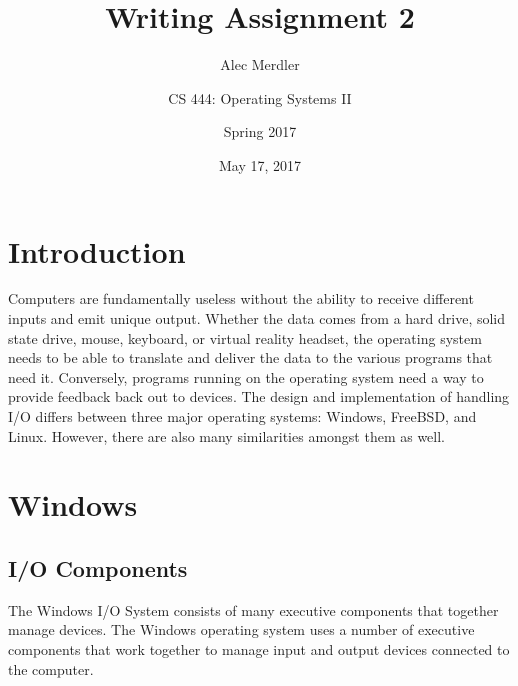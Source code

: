 \documentclass[letterpaper,draftclsnofoot,10pt,onecolumn,titlepage]{IEEEtran}\usepackage[margin=0.75in]{geometry}
\title{Writing Assignment 2}
\author{
	Alec Merdler\\
	\and
	CS 444: Operating Systems II\\
	\and
	Spring 2017\\
}
\date{May 17, 2017}
\begin{document}
\begin{titlepage}
\clearpage\maketitle
\thispagestyle{empty}

\maketitle
\end{titlepage}

\section{Introduction}
Computers are fundamentally useless without the ability to receive different inputs and emit unique output.
Whether the data comes from a hard drive, solid state drive, mouse, keyboard, or virtual reality headset,
the operating system needs to be able to translate and deliver the data to the various programs that need
it. Conversely, programs running on the operating system need a way to provide feedback back out to 
devices. The design and implementation of handling I/O differs between three major operating systems: Windows,
FreeBSD, and Linux. However, there are also many similarities amongst them as well.

\section{Windows}
 
\subsection{I/O Components}
The Windows I/O System consists of many executive components that together manage devices.
The Windows operating system uses a number of executive components that work together to manage input and 
output devices connected to the computer.
\end{document}
